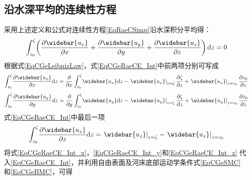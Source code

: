 \subsection{沿水深平均的连续性方程}
采用上述定义和公式对连续性方程\eqref{EqRaeCSimp}沿水深积分平均得：
\begin{equation}
  \int_{z_{0}}^{\zeta}\!
  \left(
  \frac{\partial \widebar{u_{x}}}{\partial x} +
  \frac{\partial \widebar{u_{y}}}{\partial y} +
  \frac{\partial \widebar{u_{z}}}{\partial z} 
  \right)
  \mathrm{d}z
  =
  0
  \label{EqCGeRaeCE_Int}
\end{equation}
根据式\eqref{EqCGeLeibnizLaw}，式\eqref{EqCGeRaeCE_Int}中前两项分别可写成
\begin{equation}
  \int_{z_{0}}^{\zeta}\!
  \frac{\partial \widebar{u_{x}}}{\partial x} 
  \mathrm{d}z
  =
  \frac{\partial}{\partial x}
  \int_{z_{0}}^{\zeta}\!
  \widebar{u_{x}}
  \mathrm{d}z
  -
  \left.\widebar{u_{x}}\right|_{z=\zeta}
    \frac{\partial\zeta}{\partial z}
  +
  \left.\widebar{u_{x}}\right|_{z=z_{0}}
    \frac{\partial z_{0}}{\partial z}
\label{EqCGeRaeCE_Int_x}
\end{equation}
\begin{equation}
  \int_{z_{0}}^{\zeta}\!
  \frac{\partial \widebar{u_{y}}}{\partial y} 
  \mathrm{d}z
  =
  \frac{\partial}{\partial y}
  \int_{z_{0}}^{\zeta}\!
  \widebar{u_{y}}
  \mathrm{d}z
  -
  \left.\widebar{u_{y}}\right|_{z=\zeta}
    \frac{\partial\zeta}{\partial z}
  +
  \left.\widebar{u_{y}}\right|_{z=z_{0}}
    \frac{\partial z_{0}}{\partial z}
\label{EqCGeRaeCE_Int_y}
\end{equation}
式\eqref{EqCGeRaeCE_Int}中最后一项
\begin{equation}
  \int_{z_{0}}^{\zeta}\!
  \frac{\partial \widebar{u_{z}}}{\partial z} 
  \mathrm{d}z
  =
  \left.\widebar{u_{z}}\right|_{z=\zeta}
    -
    \left.\widebar{u_{z}}\right|_{z=z_{0}}
\label{EqCGeRaeCE_Int_z}
\end{equation}
将式\eqref{EqCGeRaeCE_Int_x}，\eqref{EqCGeRaeCE_Int_y}和\eqref{EqCGeRaeCE_Int_z}
代入\eqref{EqCGeRaeCE_Int}，并利用自由表面及河床底部运动学条件式\eqref{EqCGeSMC}
和\eqref{EqCGeBMC}，可得
